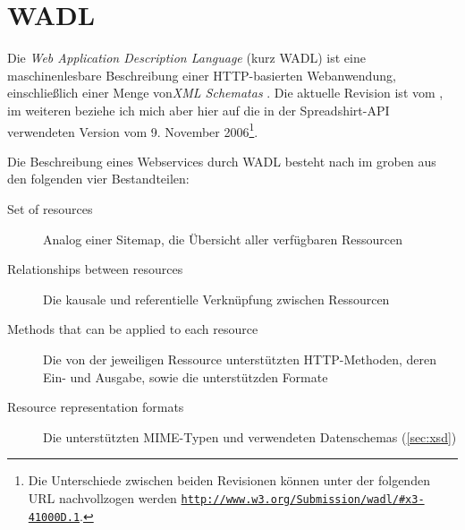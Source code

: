 \section{WADL}

Die \emph{Web Application Description Language} (kurz \gls{WADL}) ist eine maschinenlesbare Beschreibung einer HTTP-basierten Webanwendung, einschließlich einer Menge von\emph{XML Schematas} \cite{hadleyWADL}.
Die aktuelle Revision ist vom , im weiteren beziehe ich mich aber hier auf die in der Spreadshirt-API verwendeten Version vom 9. November 2006\footnote{Die Unterschiede zwischen beiden Revisionen können unter der folgenden URL nachvollzogen werden \href{http://www.w3.org/Submission/wadl/\#x3-41000D.1}{\texttt{http://www.w3.org/Submission/wadl/\#x3-41000D.1}}.}.

Die Beschreibung eines Webservices durch WADL besteht nach \cite{hadleyWADL} im groben aus den folgenden vier Bestandteilen:
\begin{description}
     \item[Set of resources] Analog einer Sitemap, die Übersicht aller verfügbaren Ressourcen
     \item[Relationships between resources] Die kausale und referentielle Verknüpfung zwischen Ressourcen
     \item[Methods that can be applied to each resource] Die von der jeweiligen Ressource unterstützten HTTP-Methoden, deren Ein- und Ausgabe, sowie die unterstützden Formate
     \item[Resource representation formats] Die unterstützten \gls{MIME}-Typen und verwendeten Datenschemas (\cref{sec:xsd})
 \end{description} 

